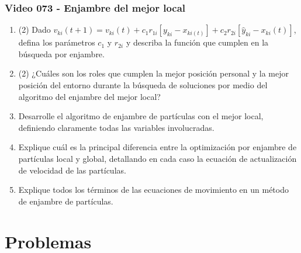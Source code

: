 \documentclass[a4paper,10pt,spanish]{article}
\begin{document}
\subsubsection{Video 073 - Enjambre del mejor local}

\begin{enumerate}
\item (2) Dado $v_{ki}(t+1)=v_{ki}(t)+c_{1}r_{1i}[y_{ki}-x_{ki(t)}]+c_{2}r_{2i}[\hat{y}_{ki}-x_{ki}(t)]$, defina los parámetros $c_{1}$ y $r_{2i}$ y describa la función que cumplen en la búsqueda por enjambre.

\item (2) ¿Cuáles son los roles que cumplen la mejor posición personal y la mejor posición del entorno durante la búsqueda de soluciones por medio del algoritmo del enjambre del mejor local?

\item Desarrolle el algoritmo de enjambre de partículas con el mejor local, definiendo claramente todas las variables involucradas.

\item Explique cuál es la principal diferencia entre la optimización por enjambre de partículas local y global, detallando en cada caso la ecuación de actualización de velocidad de las partículas.

\item Explique todos los términos de las ecuaciones de movimiento en un método de enjambre de partículas.
\end{enumerate}

\newpage

\section{Problemas}
\end{document}
